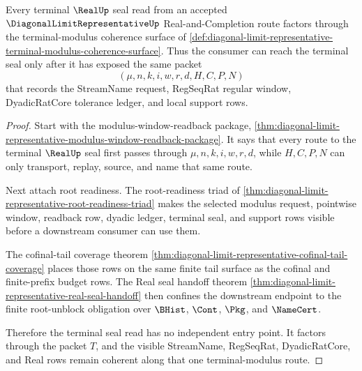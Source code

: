 \begin{theorem}
\label{thm:diagonal-limit-representative-terminal-modulus-coherence}
Every terminal $\RealUp$ seal read from an accepted $\DiagonalLimitRepresentativeUp$ Real-and-Completion route factors through the terminal-modulus coherence surface of \autoref{def:diagonal-limit-representative-terminal-modulus-coherence-surface}. Thus the consumer can reach the terminal seal only after it has exposed the same packet
$$
(\mu,n,k,i,w,r,d,H,C,P,N)
$$
that records the StreamName request, RegSeqRat regular window, DyadicRatCore tolerance ledger, and local support rows.
\end{theorem}
\begin{proof}
Start with the modulus-window-readback package, \autoref{thm:diagonal-limit-representative-modulus-window-readback-package}. It says that every route to the terminal $\RealUp$ seal first passes through $\mu,n,k,i,w,r,d$, while $H,C,P,N$ can only transport, replay, source, and name that same route.

Next attach root readiness. The root-readiness triad of \autoref{thm:diagonal-limit-representative-root-readiness-triad} makes the selected modulus request, pointwise window, readback row, dyadic ledger, terminal seal, and support rows visible before a downstream consumer can use them.

The cofinal-tail coverage theorem \autoref{thm:diagonal-limit-representative-cofinal-tail-coverage} places those rows on the same finite tail surface as the cofinal and finite-prefix budget rows. The Real seal handoff theorem \autoref{thm:diagonal-limit-representative-real-seal-handoff} then confines the downstream endpoint to the finite root-unblock obligation over $\BHist$, $\Cont$, $\Pkg$, and $\NameCert$.

Therefore the terminal seal read has no independent entry point. It factors through the packet $T$, and the visible StreamName, RegSeqRat, DyadicRatCore, and Real rows remain coherent along that one terminal-modulus route.
\end{proof}

